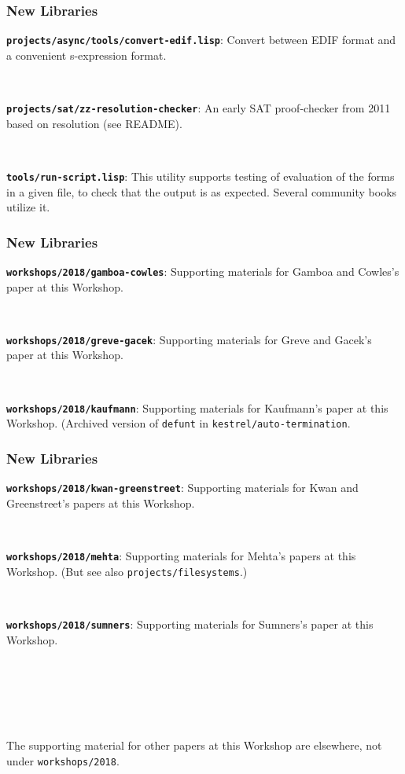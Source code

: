 \documentclass{beamer}
\newcommand{\code}[1]{\texttt{#1}}
\newcommand{\bookpath}[1]{\textbf{\code{#1}}}
\newcommand{\newlibtitle}{\frametitle{New Libraries}}
\begin{document}

\begin{frame}

\newlibtitle

\bookpath{projects/async/tools/convert-edif.lisp}:
Convert between EDIF format and a convenient s-expression format.

\

\bookpath{projects/sat/zz-resolution-checker}:
An early SAT proof-checker from 2011 based on resolution (see README).

\

\bookpath{tools/run-script.lisp}:
This utility supports testing of evaluation of the forms
  in a given file, to check that the output is as expected.  Several
  community books utilize it.

\end{frame}


\begin{frame}

\newlibtitle

\bookpath{workshops/2018/gamboa-cowles}:
Supporting materials for Gamboa and Cowles's paper at this Workshop.

\

\bookpath{workshops/2018/greve-gacek}:
Supporting materials for Greve and Gacek's paper at this Workshop.

\

\bookpath{workshops/2018/kaufmann}:
Supporting materials for Kaufmann's paper at this Workshop.
(Archived version of \code{defunt} in \code{kestrel/auto-termination}.

\end{frame}


\begin{frame}

\newlibtitle

\bookpath{workshops/2018/kwan-greenstreet}:
Supporting materials for Kwan and Greenstreet's papers at this Workshop.

\

\bookpath{workshops/2018/mehta}:
Supporting materials for Mehta's papers at this Workshop.
(But see also \code{projects/filesystems}.)

\

\bookpath{workshops/2018/sumners}:
Supporting materials for Sumners's paper at this Workshop.

\

\

\

The supporting material for other papers at this Workshop
are elsewhere, not under \code{workshops/2018}.

\end{frame}
\end{document}
